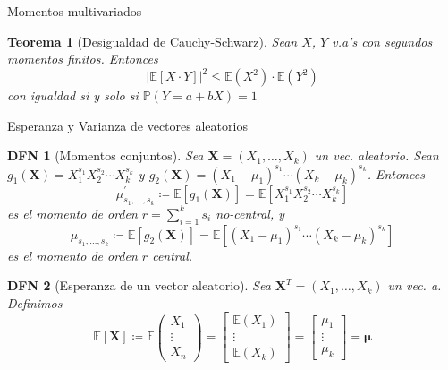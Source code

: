 \documentclass[a4paper]{article}
\newtheorem{definition}{DFN}
\theoremstyle{mytheoremstyle}
\newtheorem{theorem}{Teorema}
\newcommand{\IP}{\mathbb{P}}
\newcommand{\E}{\mathbb{E}}
\newcommand{\1}{\mathds{1}}
\providecommand{\abs}[1]{\left|#1\right|}
\renewcommand{\vec}[1]{\boldsymbol{#1}}
\begin{document}
\begin{multicols*}{3}
\begin{roundbox}{Momentos multivariados}
\begin{theorem}[Desigualdad de Cauchy-Schwarz]
    Sean $X$, $Y$ v.a's con segundos momentos finitos.
    Entonces
    \begin{equation*}
        \abs{\E\left[ X \cdot Y \right]}^{2} \leq \E\left( X^{2} \right) \cdot \E\left( Y^{2} \right)
    \end{equation*}
    con igualdad si y solo si $\IP(Y = a + bX) = 1$
\end{theorem}
\end{roundbox}

\begin{roundbox}{Esperanza y Varianza de vectores aleatorios}
\begin{definition}[Momentos conjuntos]
    Sea $\vec{X} = (X_1, \dots , X_k)$ un vec. aleatorio.
    Sean $g_1(\vec{X}) = X_{1}^{s_1} X_{2}^{s_2} \cdots X_{k}^{s_k}$ y $g_2(\vec{X}) = \left( X_1 - \mu_1 \right)^{s_1} \cdots \left( X_k - \mu_k  \right)^{s_k}$.
    Entonces 
    \begin{equation*}
        \mu_{s_1, \dots, s_k}^{'} \coloneqq \E \left[ g_1(\vec{X}) \right] = \E \left[ X_{1}^{s_1} X_{2}^{s_2} \cdots X_{k}^{s_k} \right] 
    \end{equation*}
    es el momento de orden $r = \sum_{i=1}^{k} s_i$ no-central, y
    \begin{equation*}
        \mu_{s_1, \dots, s_k} \coloneqq \E \left[ g_2(\vec{X}) \right] = \E \left[ \left( X_1 - \mu_1 \right)^{s_1} \cdots \left( X_k - \mu_k \right)^{s_k} \right]
    \end{equation*}
    es el momento de orden $r$ central.
\end{definition}

\begin{definition}[Esperanza de un vector aleatorio]
    Sea $\vec{X}^{T} = (X_1, \dots , X_k)$ un vec. a.
    Definimos
    \begin{equation*}
        \E[\vec{X}] \coloneqq \E \left( \begin{array}{c}
            X_1 \\ 
            \vdots \\
            X_n
        \end{array} \right) = 
        \begin{bmatrix}
            \E(X_1) \\
            \vdots \\
            \E(X_k)
        \end{bmatrix}
        =
        \begin{bmatrix}
            \mu_1 \\
            \vdots \\
            \mu_k
        \end{bmatrix}
        = \vec{\mu}
    \end{equation*}
\end{definition}


\end{roundbox}
\end{multicols*}
\end{document}

